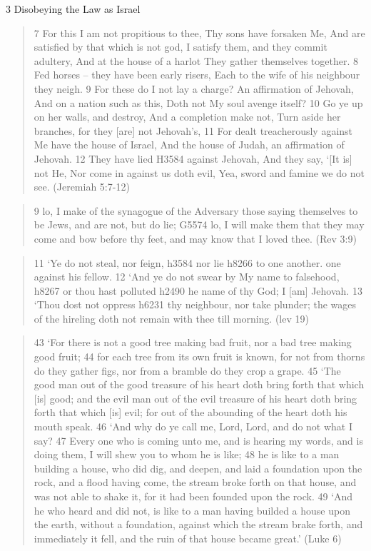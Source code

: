 \documentclass[11pt]{article}
\begin{document}
{\Large 3 Disobeying the Law as Israel}\newline
\begin{quote}
7 For this I am not propitious to thee, Thy sons have forsaken Me, And are satisfied by that which is not god, I satisfy them, and they commit adultery, And at the house of a harlot They gather themselves together.
8 Fed horses -- they have been early risers, Each to the wife of his neighbour they neigh.
9 For these do I not lay a charge? An affirmation of Jehovah, And on a nation such as this, Doth not My soul avenge itself?
10 Go ye up on her walls, and destroy, And a completion make not, Turn aside her branches, for they [are] not Jehovah's,
11 For dealt treacherously against Me have the house of Israel, And the house of Judah, an affirmation of Jehovah.
12 They have lied H3584 against Jehovah, And they say, `[It is] not He, Nor come in against us doth evil, Yea, sword and famine we do not see.
(Jeremiah 5:7-12)
\end{quote}
\begin{quote}
9 lo, I make of the synagogue of the Adversary those saying themselves to be Jews, and are not, but do lie; G5574 lo, I will make them that they may come and bow before thy feet, and may know that I loved thee.
(Rev 3:9)
\end{quote}
\begin{quote}
11 `Ye do not steal, nor feign, h3584 nor lie h8266 to one another. one against his fellow.
12 `And ye do not swear by My name to falsehood,	h8267 or thou hast polluted  h2490 he name of thy God; I [am] Jehovah. 13  `Thou dost not oppress  h6231 thy neighbour, nor take plunder; the wages of the hireling doth not remain with thee till morning.
(lev 19)
\end{quote}
\begin{quote}
43 `For there is not a good tree making bad fruit, nor a bad tree making good fruit;
44 for each tree from its own fruit is known, for not from thorns do they gather figs, nor from a bramble do they crop a grape.
45 `The good man out of the good treasure of his heart doth bring forth that which [is] good; and the evil man out of the evil treasure of his heart doth bring forth that which [is] evil; for out of the abounding of the heart doth his mouth speak.
46 `And why do ye call me, Lord, Lord, and do not what I say?
47 Every one who is coming unto me, and is hearing my words, and is doing them, I will shew you to whom he is like;
48 he is like to a man building a house, who did dig, and deepen, and laid a foundation upon the rock, and a flood having come, the stream broke forth on that house, and was not able to shake it, for it had been founded upon the rock.
49 `And he who heard and did not, is like to a man having builded a house upon the earth, without a foundation, against which the stream brake forth, and immediately it fell, and the ruin of that house became great.' (Luke 6)
\end{quote}
\end{document}
